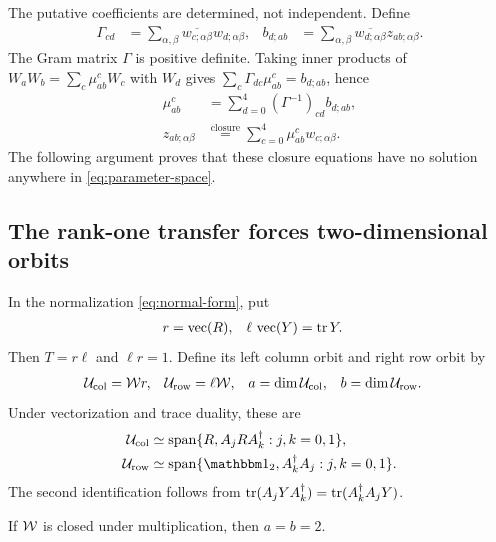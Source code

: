The putative coefficients are determined, not independent.
Define
\begin{align}
	\Gamma_{cd}
	 & =\sum_{\alpha,\beta}
	\overline{w_{c;\alpha\beta}}w_{d;\alpha\beta},
	 &
	b_{d;ab}
	 & =\sum_{\alpha,\beta}
	\overline{w_{d;\alpha\beta}}z_{ab;\alpha\beta}.
\end{align}
The Gram matrix $\Gamma$ is positive definite. Taking inner products
of $W_aW_b=\sum_c\mu_{ab}^cW_c$ with $W_d$ gives
$\sum_c\Gamma_{dc}\mu_{ab}^c=b_{d;ab}$, hence
\begin{align}
	\mu_{ab}^c
	 & =\sum_{d=0}^4(\Gamma^{-1})_{cd}b_{d;ab},
	\nonumber                                   \\
	z_{ab;\alpha\beta}
	 & \stackrel{\mathrm{closure}}{=}
	\sum_{c=0}^4\mu_{ab}^cw_{c;\alpha\beta}.
	\label{eq:closure-equations}
\end{align}
The following argument proves that these closure equations have no
solution anywhere in \cref{eq:parameter-space}.

\subsection{The rank-one transfer forces two-dimensional orbits}

In the normalization \cref{eq:normal-form}, put
\begin{align}
	r                           & =\operatorname{vec}(R),
	                            &
	\ell\,\operatorname{vec}(Y) & =\operatorname{tr} Y.
\end{align}
Then $T=r\ell$ and $\ell r=1$.
Define its left column orbit and right row orbit by
\begin{align}
	\mathcal{U}_{\mathrm{col}} & =\mathcal{W} r,
	                     &
	\mathcal{U}_{\mathrm{row}} & =\ell\mathcal{W},
	                     &
	a                    & =\dim\mathcal{U}_{\mathrm{col}},
	                     &
	b                    & =\dim\mathcal{U}_{\mathrm{row}}.
	\label{eq:orbits}
\end{align}
Under vectorization and trace duality, these are
\begin{align}
	\mc U_{\mathrm{col}}
	 & \simeq\operatorname{span}
	\{R,A_jRA_k^\dagger:j,k=0,1\},
	\nonumber                    \\
	\mc U_{\mathrm{row}}
	 & \simeq\operatorname{span}
	\{\Id_2,A_k^\dagger A_j:j,k=0,1\}.
	\label{eq:orbit-matrices}
\end{align}
The second identification follows from
$\operatorname{tr}(A_jYA_k^\dagger)=\operatorname{tr}(A_k^\dagger A_jY)$.

\begin{lemma}
	\label{lem:orbit}
	If $\mathcal{W}$ is closed under multiplication, then $a=b=2$.
\end{lemma}

